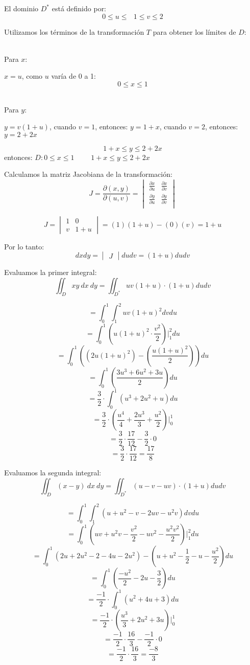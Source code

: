 El dominio $D^*$ está definido por:
$$0 \leq u \leq \ \ \  1 \leq v \leq 2$$

Utilizamos los términos de la transformación $T$ para obtener los límites de $D$:

\vspace{0.2cm}

\\Para $x$:

$x = u$, como $u$ varía de 0 a 1:
$$0 \leq x \leq 1$$

\\Para $y$:

$y = v(1+u)$, cuando $v = 1$, entonces: $y = 1 + x$, cuando $v = 2$, entonces: $y= 2 + 2x$

$$1 + x \leq y \leq 2 + 2x$$
entonces: $D: 0 \leq x \leq 1$ \ \ \ \ $1 + x \leq y \leq 2 + 2x$

Calculamos la matriz Jacobiana de la transformación:
$$J = \frac{\partial(x,y)}{\partial(u,v)} = \begin{vmatrix}
    \frac{\partial x}{\partial u} & \frac{\partial x}{\partial v}\\
\frac{\partial y}{\partial u} & \frac{\partial y}{\partial v}\\
\end{vmatrix}$$

$$J = \begin{vmatrix}
1 & 0\\
v & 1 + u
\end{vmatrix} = (1)(1 + u) - (0)(v) = 1 + u$$

Por lo tanto: $$dxdy = \begin{vmatrix}
J
\end{vmatrix} dudv = (1 + u)dudv$$

Evaluamos la primer integral:
$$\iint_D xy \ dx \ dy = \iint_{D^*} uv(1 + u) \cdot (1 + u)dudv$$

$$= \int_{0}^{1}\int_{1}^{2} uv(1 + u)^2dvdu$$
$$= \int_{0}^{1}(u(1 + u)^2 \cdot \frac{v^2}{2}) \Big|_1^2 du$$
$$= \int_{0}^{1}((2u(1 + u)^2) - (\frac{u(1 + u)^2}{2})) du$$
$$= \int_{0}^{1}(\frac{3u^3 + 6u^2 + 3u}{2}) du$$
$$= \frac{3}{2} \cdot \int_{0}^{1}(u^3 + 2u^2 + u) du$$
$$= \frac{3}{2} \cdot (\frac{u^4}{4} + \frac{2u^3}{3} + \frac{u^2}{2}) \Big|_0^1$$
$$= \frac{3}{2} \cdot \frac{17}{12} - \frac{3}{2} \cdot 0$$
$$= \frac{3}{2} \cdot \frac{17}{12} = \frac{17}{8}$$

\vspace{0.3cm}

Evaluamos la segunda integral:
$$\iint_D (x - y) \ dx \ dy = \iint_{D^*} (u - v - uv) \cdot (1 + u)dudv$$

$$= \int_{0}^{1}\int_{1}^{2} (u + u^2 - v -2uv - u^2v)dvdu$$
$$= \int_{0}^{1}(uv + u^2v - \frac{v^2}{2} - uv^2 - \frac{u^2v^2}{2}) \Big|_1^2 du$$
$$= \int_{0}^{1}(2u + 2u^2 - 2 - 4u -2u^2) - (u + u^2 - \frac{1}{2} - u - \frac{u^2}{2}) du$$
$$= \int_{0}^{1}(\frac{-u^2}{2} - 2u - \frac{3}{2}) du$$
$$= \frac{-1}{2} \cdot \int_{0}^{1}(u^2 + 4u + 3) du$$
$$= \frac{-1}{2} \cdot (\frac{u^3}{3} + 2u^2 + 3u) \Big|_0^1$$
$$= \frac{-1}{2} \cdot \frac{16}{3} - \frac{-1}{2} \cdot 0$$
$$= \frac{-1}{2} \cdot \frac{16}{3} = \frac{-8}{3}$$
